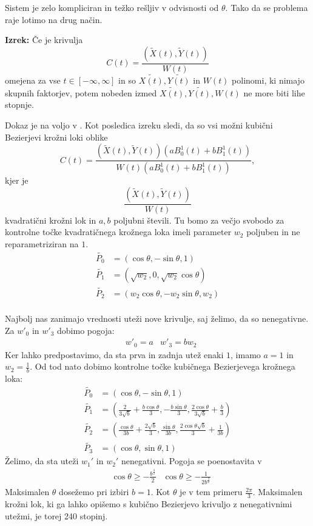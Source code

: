 \documentclass[a4paper,12pt]{article}
\begin{document}
Sistem je zelo kompliciran in težko rešljiv v odvisnosti od $\theta$. Tako da se problema raje lotimo na drug način. \\
\medskip

\noindent
\textbf{Izrek:} Če je krivulja
$$
C(t) = \frac{(\tilde{X}(t), \tilde{Y}(t))}{W(t)}
$$
omejena za vse $t \in [-\infty, \infty]$ in so $\tilde{X(t)}, \tilde{Y(t)}$ in $W(t)$ polinomi, ki nimajo skupnih faktorjev, potem nobeden izmed $\tilde{X(t)}, \tilde{Y(t)}, W(t)$ ne more biti lihe stopnje.

\medskip

\noindent

Dokaz je na voljo v \cite{article}. Kot posledica izreku sledi, da so vsi možni kubični Bezierjevi krožni loki oblike 
$$
C(t) = \frac{(\tilde{X}(t), \tilde{Y}(t))(a B_{0}^1(t) + b B_{1}^1(t))}{W(t)(a B_{0}^1(t) + b B_{1}^1(t))},
$$
kjer je 
$$
\frac{(\tilde{X}(t), \tilde{Y}(t))}{W(t)} 
$$
kvadratični krožni lok in $a,b$ poljubni števili. Tu bomo za večjo svobodo za kontrolne točke kvadratičnega krožnega loka imeli parameter $w_{2}$ poljuben in ne reparametriziran na $1$.
\begin{align*}
\tilde{P_{0}} &= (\cos \theta, - \sin \theta, 1) \\
\tilde{P_{1}} &= (\sqrt{w_{2}}, 0, \sqrt{w_{2}} \cos \theta) \\
\tilde{P_{2}} &= (w_{2}\cos \theta, - w_{2}\sin \theta, w_{2}) \\
\end{align*}

\noindent
Najbolj nas zanimajo vrednosti uteži nove krivulje, saj želimo, da so nenegativne. Za $w'_{0}$ in $w'_{3}$ dobimo pogoja:
\begin{align*}
& w'_{0} = a & w'_{3} = b w_{2}
\end{align*}
Ker lahko predpostavimo, da sta prva in zadnja utež enaki $1$, imamo $a=1$ in $w_{2} = \frac{1}{b}$. Od tod nato dobimo kontrolne točke kubičnega Bezierjevega krožnega loka:
\begin{align*}
\tilde{P_{0}} &= (\cos \theta, - \sin \theta, 1) \\
\tilde{P_{1}} &= (\frac{2}{3 \sqrt{b}} + \frac{b \cos \theta}{3}, - \frac{b \sin \theta}{3}, \frac{2 \cos \theta}{3 \sqrt{b}} + \frac{b}{3}) \\
\tilde{P_{2}} &= (\frac{\cos \theta}{3b} + \frac{2\sqrt{b}}{3}, \frac{\sin \theta}{3b}, \frac{2 \cos \theta \sqrt{b}}{3} + \frac{1}{3b}) \\
\tilde{P_{3}} &= (\cos \theta, \sin \theta, 1)
\end{align*}
Želimo, da sta uteži $w_{1}'$ in $w_{2}'$ nenegativni. Pogoja se poenostavita v
\begin{align*}
&\cos \theta \geq -\frac{b^{\frac{3}{2}}}{2}& \cos \theta \geq - \frac{1}{2 b^{\frac{3}{2}}}
\end{align*}
Maksimalen $\theta$ dosežemo pri izbiri $b=1$. Kot $\theta$ je v tem primeru $\frac{2\pi}{3}$. Maksimalen krožni lok, ki ga lahko opišemo s kubično Bezierjevo krivuljo z nenegativnimi utežmi, je torej 240 stopinj.
\end{document}
